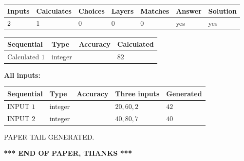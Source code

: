 \documentclass[12pt]{article}
\begin{document}
 

 
   
   
   
   
\noindent\begin{tabular}{|l|l|l|l|l|l|l|}
 \hline
Inputs & Calculates & Choices & Layers & Matches & Answer & Solution \\ \hline
 2  & 
 1  & 
 0
  & 
 0  & 
 0  & 
  yes & 
  yes 
  \\ \hline
 \end{tabular}
   
   
   
   
\noindent{}
   
   
  
  
\noindent\begin{tabular}{|l|l|l|l|}
\hline
 Sequential & Type & Accuracy & Calculated \\ 
\hline
 
 
  Calculated $  1 $ & integer &  & 
  $ 82 $ 
 \\  \hline  
 \end{tabular}
   
   
   
   
\noindent\vspace{0.1in}\hspace{-0.08in} {\textbf{\Large{All inputs: }}}
   
   
  
  
\noindent\begin{tabular}{|l|l|l|l|l|}
\hline
 Sequential & Type & Accuracy & Three inputs & Generated \\ 
\hline
 
 
  INPUT $  1 $ & integer &  & $
 20
 , 
 60
 , 
 2
 $ & $ 42 $ 
 \\  \hline  
 
 
  INPUT $  2 $ & integer &  & $
 40
 , 
 80
 , 
 7
 $ & $ 40 $ 
 \\  \hline  
 \end{tabular}
   
   
   
   
   
   
 \vspace{0.2in}
 
   
   
\vspace{2.0in} PAPER TAIL GENERATED.
   
   
   
   
\vspace{1.0in} 
{\textbf{\large{ *** END OF PAPER, THANKS *** }}} 
   
\end{document}
